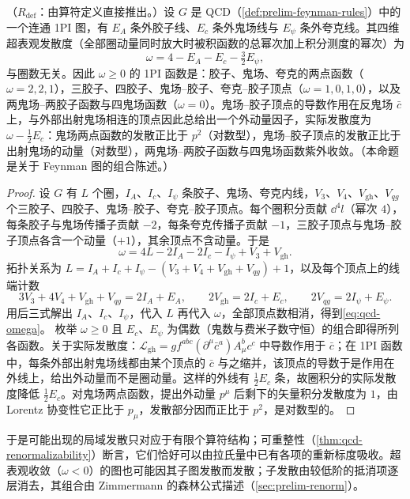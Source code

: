 \begin{proposition}\label{prop:qcd-superficial-degree}
（$R_{\mathrm{def}}$：由算符定义直接推出。）设 $G$ 是 QCD（\cref{def:prelim-feynman-rules}）中的一个连通 1PI 图，有 $E_A$ 条外胶子线、$E_c$ 条外鬼场线与 $E_\psi$ 条外夸克线。其四维超表观发散度（全部圈动量同时放大时被积函数的总幂次加上积分测度的幂次）为
\begin{equation}\label{eq:qcd-omega}
\omega=4-E_A-E_c-\tfrac32E_\psi ,
\end{equation}
与圈数无关。因此 $\omega\ge0$ 的 1PI 函数是：胶子、鬼场、夸克的两点函数（$\omega=2,2,1$），三胶子、四胶子、鬼场--胶子、夸克--胶子顶点（$\omega=1,0,1,0$），以及两鬼场--两胶子函数与四鬼场函数（$\omega=0$）。鬼场--胶子顶点的导数作用在反鬼场 $\bar c$ 上，与外部出射鬼场相连的顶点因此总给出一个外动量因子，实际发散度为 $\omega-\frac12E_c$：鬼场两点函数的发散正比于 $p^2$（对数型），鬼场--胶子顶点的发散正比于出射鬼场的动量（对数型），两鬼场--两胶子函数与四鬼场函数紫外收敛。（本命题是关于 Feynman 图的组合陈述。）
\end{proposition}

\begin{proof}
设 $G$ 有 $L$ 个圈，$I_A$、$I_c$、$I_\psi$ 条胶子、鬼场、夸克内线，$V_3$、$V_4$、$V_{\mathrm{gh}}$、$V_{qg}$ 个三胶子、四胶子、鬼场--胶子、夸克--胶子顶点。每个圈积分贡献 $\dd^4l$（幂次 $4$），每条胶子与鬼场传播子贡献 $-2$，每条夸克传播子贡献 $-1$，三胶子顶点与鬼场--胶子顶点各含一个动量（$+1$），其余顶点不含动量。于是
\[
\omega=4L-2I_A-2I_c-I_\psi+V_3+V_{\mathrm{gh}}.
\]
拓扑关系为 $L=I_A+I_c+I_\psi-(V_3+V_4+V_{\mathrm{gh}}+V_{qg})+1$，以及每个顶点上的线端计数
\[
3V_3+4V_4+V_{\mathrm{gh}}+V_{qg}=2I_A+E_A,\qquad 2V_{\mathrm{gh}}=2I_c+E_c,\qquad 2V_{qg}=2I_\psi+E_\psi .
\]
用后三式解出 $I_A$、$I_c$、$I_\psi$，代入 $L$ 再代入 $\omega$，全部顶点数相消，得到\cref{eq:qcd-omega}。%
枚举 $\omega\ge0$ 且 $E_c$、$E_\psi$ 为偶数（鬼数与费米子数守恒）的组合即得所列各函数。关于实际发散度：$\mathcal L_{\mathrm{gh}}=gf^{abc}(\partial^\mu\bar c^a)A^b_\mu c^c$ 中导数作用于 $\bar c$；在 1PI 函数中，每条外部出射鬼场线都由某个顶点的 $\bar c$ 与之缩并，该顶点的导数于是作用在外线上，给出外动量而不是圈动量。这样的外线有 $\frac12E_c$ 条，故圈积分的实际发散度降低 $\frac12E_c$。对鬼场两点函数，提出外动量 $p^\mu$ 后剩下的矢量积分发散度为 $1$，由 Lorentz 协变性它正比于 $p_\mu$，发散部分因而正比于 $p^2$，是对数型的。
\end{proof}

于是可能出现的局域发散只对应于有限个算符结构；可重整性（\cref{thm:qcd-renormalizability}）断言，它们恰好可以由拉氏量中已有各项的重新标度吸收。超表观收敛（$\omega<0$）的图也可能因其子图发散而发散；子发散由较低阶的抵消项逐层消去，其组合由 Zimmermann 的森林公式描述（\cref{sec:prelim-renorm}）。

